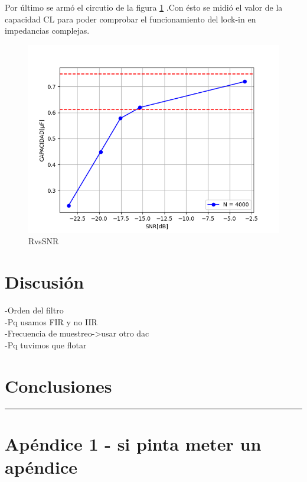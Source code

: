 \documentclass[11pt,a4paper]{extarticle}
\begin{document}
\begin{multicols}{2}
Por último se armó el circutio de la figura 
\ref{fig:CvsSNR} .Con ésto 
se midió el valor de la capacidad CL para poder 
comprobar el funcionamiento del lock-in en 
impedancias complejas.

\begin{figure}[H]
	\centering
	\includegraphics[width=\linewidth]{Images/CvsSNR(segunda).png}
	\caption{RvsSNR}
	\label{fig:CvsSNR}
\end{figure}


\section{Discusión}
-Orden del filtro\\
-Pq usamos FIR y no IIR\\
-Frecuencia de muestreo->usar otro dac\\
-Pq tuvimos que flotar\\

\section{Conclusiones}





\end{multicols}
\newpage
\begin{appendices}
\vspace{-1em}
\hrule
\vspace{1em}
\normalsize
\section{Apéndice 1 - si pinta meter un apéndice}
\end{appendices}
\end{document}

